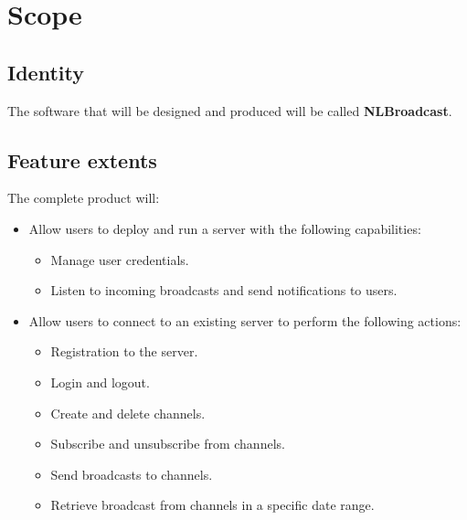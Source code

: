 \documentclass[11pt]{report}
\newcommand{\+}{\discretionary{\mbox{\scriptsize$\hookleftarrow$}}{}{}}
\renewcommand\emph{\textbf}
\begin{document}
        \section{Scope}

                \subsection{Identity}
                    The software that will be designed and produced will be called \emph{NLBroadcast}.

                \subsection{Feature extents}

                    The complete product will:

                    \begin{itemize}
                        \item Allow users to deploy and run a server with the following capabilities:

                            \begin{itemize}
                                \item Manage user credentials.
                                \item Listen to incoming broadcasts and send notifications to users.
                            \end{itemize}

                        \item Allow users to connect to an existing server to perform the following actions:
                            \begin{itemize}
                                \item Registration to the server.
                                \item Login and logout.
                                \item Create and delete channels.
                                \item Subscribe and unsubscribe from channels.
                                \item Send broadcasts to channels.
                                \item Retrieve broadcast from channels in a specific date range.
                            \end{itemize}

                    \end{itemize}
\end{document}
